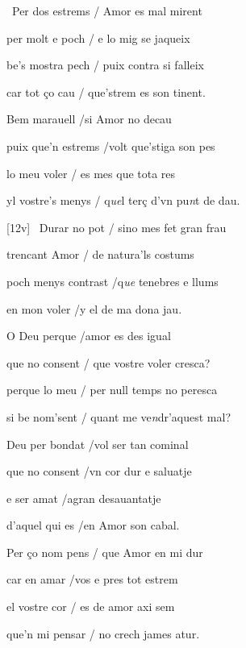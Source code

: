 \documentclass[12pt]{article}
\begin{document}
\begin{estrofa}

 \textparagraph\  Per dos estrems / Amor es mal mirent

 per molt e poch / e lo mig se jaqueix

 be's mostra pech / puix contra si falleix

 car tot \c{c}o cau / que'strem es son tinent.

 Bem marauell /si Amor no decau

 puix que'n estrems /volt que'stiga son pes

 lo meu voler / es mes que tota res

 yl vostre's menys / q\textit{ue}l ter\c{c} d'vn pu\textit{n}t de dau.

\end{estrofa}



\begin{estrofa}

 [12v] \textparagraph\  Durar no pot / sino mes fet gran frau

 trencant Amor / de natura'ls costums

 poch menys contrast /q\textit{ue} tenebres e llums

 en mon voler /y el de ma dona jau.

 O Deu perque /amor es des igual

 que no consent / que vostre voler cresca?

 perque lo meu / per null temps no peresca

 si be nom'sent / quant me ve\textit{n}dr'aquest mal?

\end{estrofa}



\begin{estrofa}

 Deu per bondat /vol ser tan cominal

 que no consent /vn cor dur e saluatje

 e ser amat /agran desauantatje

 d'aquel qui es /en Amor son cabal.

 Per \c{c}o nom pens / que Amor en mi dur

 car en amar /vos e pres tot estrem

 el vostre cor / es de amor axi sem

 que'n mi pensar / no crech james atur.

\end{estrofa}
\end{document}
